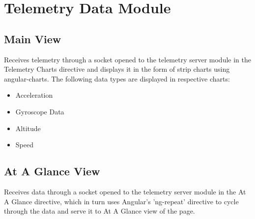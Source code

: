\section{Telemetry Data Module}

\subsection{Main View}
  Receives telemetry through a socket opened to the telemetry server module in the Telemetry Charts 
  directive and displays it in the form of strip charts using angular-charts. The following data 
  types are displayed in respective charts:
  \begin{itemize}
  	\item Acceleration
  	\item Gyroscope Data
  	\item Altitude
  	\item Speed
  \end{itemize}

\subsection{At A Glance View}
  Receives data through a socket opened to the telemetry server module in the At A Glance directive,
  which in turn uses Angular's 'ng-repeat' directive to cycle through the data and serve it to At A
  Glance view of the page.
